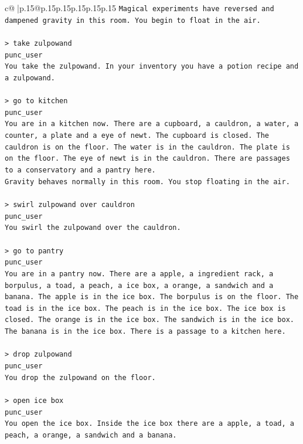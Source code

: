 \documentclass{article}
\begin{document}
{\begin{supertabular}{c@{$\;$}|p{.15\linewidth}@{}p{.15\linewidth}p{.15\linewidth}p{.15\linewidth}p{.15\linewidth}p{.15\linewidth}}
{{{\texttt{Magical experiments have reversed and dampened gravity in this room. You begin to float in the air.} \\
\\ 
\texttt{> take zulpowand} \\
\texttt{punc\_user} \\
\texttt{You take the zulpowand. In your inventory you have a potion recipe and a zulpowand.} \\
\\ 
\texttt{> go to kitchen} \\
\texttt{punc\_user} \\
\texttt{You are in a kitchen now. There are a cupboard, a cauldron, a water, a counter, a plate and a eye of newt. The cupboard is closed. The cauldron is on the floor. The water is in the cauldron. The plate is on the floor. The eye of newt is in the cauldron. There are passages to a conservatory and a pantry here.} \\
\texttt{Gravity behaves normally in this room. You stop floating in the air.} \\
\\ 
\texttt{> swirl zulpowand over cauldron} \\
\texttt{punc\_user} \\
\texttt{You swirl the zulpowand over the cauldron.} \\
\\ 
\texttt{> go to pantry} \\
\texttt{punc\_user} \\
\texttt{You are in a pantry now. There are a apple, a ingredient rack, a borpulus, a toad, a peach, a ice box, a orange, a sandwich and a banana. The apple is in the ice box. The borpulus is on the floor. The toad is in the ice box. The peach is in the ice box. The ice box is closed. The orange is in the ice box. The sandwich is in the ice box. The banana is in the ice box. There is a passage to a kitchen here.} \\
\\ 
\texttt{> drop zulpowand} \\
\texttt{punc\_user} \\
\texttt{You drop the zulpowand on the floor.} \\
\\ 
\texttt{> open ice box} \\
\texttt{punc\_user} \\
\texttt{You open the ice box. Inside the ice box there are a apple, a toad, a peach, a orange, a sandwich and a banana.} \\
}}}
\end{supertabular}}
\end{document}

